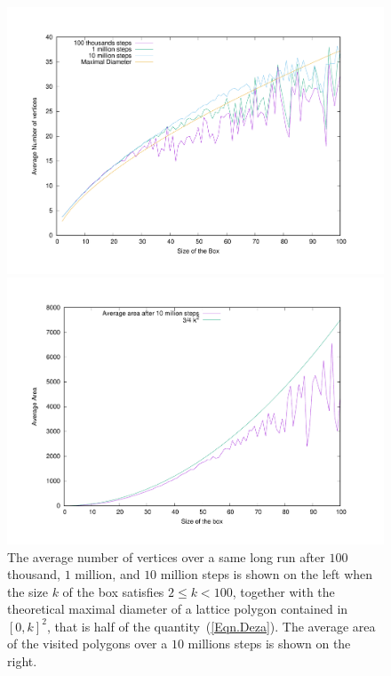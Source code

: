 \documentclass[a4paper]{article}
\begin{document}
\noindent
\begin{figure}[ht]
  \begin{center}
    \begin{minipage}[c]{.49\linewidth}
      \includegraphics[scale=.25]{averageVertices}
    \end{minipage}
    \begin{minipage}[c]{.49\linewidth}
      \includegraphics[scale=.25]{averageVolume10M}
    \end{minipage}
    \caption{The average number of vertices over a same long run after $100$ thousand, $1$ million, and $10$ million steps is shown on the left when the size $k$ of the box satisfies $2\leq k<100$, together with the theoretical maximal diameter of a lattice polygon contained in $[0,k]^2$, that is half of the quantity~(\ref{Eqn.Deza}). The average area of the visited polygons over a $10$ millions steps is shown on the right.
    \label{Fig.NV}}
  \end{center}
\end{figure}
\end{document}
